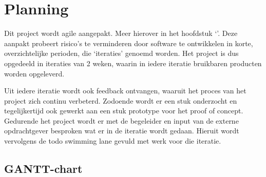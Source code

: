 
\chapter{Planning}
Dit project wordt agile aangepakt. Meer hierover in het hoofdstuk ‘’. Deze aanpakt probeert risico's te verminderen door software te ontwikkelen in korte, overzichtelijke perioden, die ‘iteraties’ genoemd worden. Het project is dus opgedeeld in iteraties van 2 weken, waarin in iedere iteratie bruikbaren producten worden opgeleverd.\par

Uit iedere iteratie wordt ook feedback ontvangen, waaruit het proces van het project zich continu verbeterd. Zodoende wordt er een stuk onderzocht en tegelijkertijd ook gewerkt aan een stuk prototype voor het proof of concept. Gedurende het project wordt er met de begeleider en input van de externe opdrachtgever besproken wat er in de iteratie wordt gedaan. Hieruit wordt vervolgens de todo swimming lane gevuld met werk voor die iteratie.

\section{GANTT-chart}

